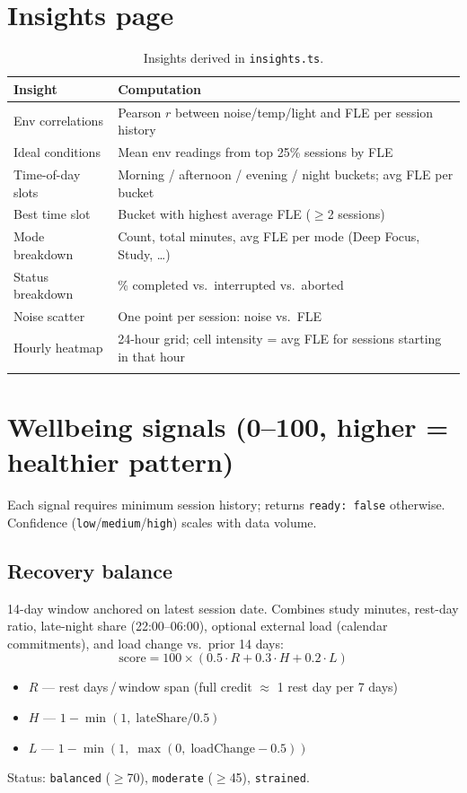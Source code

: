 \documentclass[11pt,a4paper]{report}
\newcommand{\filepath}[1]{\texttt{#1}}
\begin{document}
\section{Insights page}

\begin{longtable}{@{}p{3.2cm}p{9.4cm}@{}}
\toprule
\textbf{Insight} & \textbf{Computation} \\
\midrule
\endhead
Env correlations & Pearson $r$ between noise/temp/light and FLE per session history \\
Ideal conditions & Mean env readings from top 25\% sessions by FLE \\
Time-of-day slots & Morning / afternoon / evening / night buckets; avg FLE per bucket \\
Best time slot & Bucket with highest average FLE ($\geq$2 sessions) \\
Mode breakdown & Count, total minutes, avg FLE per mode (Deep Focus, Study, \ldots) \\
Status breakdown & \% completed vs.\ interrupted vs.\ aborted \\
Noise scatter & One point per session: noise vs.\ FLE \\
Hourly heatmap & 24-hour grid; cell intensity = avg FLE for sessions starting in that hour \\
\bottomrule
\caption{Insights derived in \filepath{insights.ts}.}
\end{longtable}

\section{Wellbeing signals (0--100, higher = healthier pattern)}

Each signal requires minimum session history; returns \texttt{ready: false} otherwise.
Confidence (\texttt{low}/\texttt{medium}/\texttt{high}) scales with data volume.

\subsection{Recovery balance}

14-day window anchored on latest session date. Combines study minutes, rest-day ratio,
late-night share (22:00--06:00), optional external load (calendar commitments), and
load change vs.\ prior 14 days:
\[
  \mathrm{score} = 100 \times (0.5 \cdot R + 0.3 \cdot H + 0.2 \cdot L)
\]
\begin{itemize}[leftmargin=*]
  \item $R$ --- rest days\,/\,window span (full credit $\approx$ 1 rest day per 7 days)
  \item $H$ --- $1 - \min(1,\; \mathrm{lateShare}/0.5)$
  \item $L$ --- $1 - \min(1,\; \max(0,\; \mathrm{loadChange} - 0.5))$
\end{itemize}
Status: \texttt{balanced} ($\geq$70), \texttt{moderate} ($\geq$45), \texttt{strained}.
\end{document}
